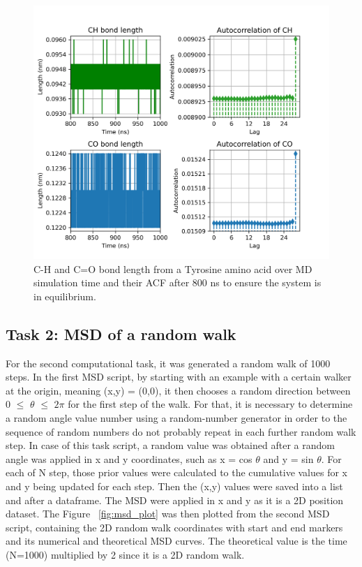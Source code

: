 \documentclass{article}
\begin{document}
\begin{figure}[H]
\includegraphics[width=\linewidth]{CO_CH_length_acf_plot.png}
\caption{C-H and C=O bond length from a Tyrosine amino acid over MD simulation time and their ACF after 800 ns to ensure the system is in equilibrium.}
\label{fig:acf_plot}
\end{figure}

\subsection{Task 2: MSD of a random walk}

For the second computational task, it was generated a random walk of 1000 steps. In the first MSD script, by starting with an example with a certain walker at the origin, meaning (x,y) = (0,0), it then chooses a random direction between 0 $\leq$ $\theta$ $\leq$ $2\pi$ for the first step of the walk. For that, it is necessary to determine a random angle value number using a random-number generator in order to the sequence of random numbers do not probably repeat in each further random walk step. In case of this task script, a random value was obtained after a random angle was applied in x and y coordinates, such as x = cos $\theta$ and y = sin $\theta$. For each of N step, those prior values were calculated to the cumulative values for x and y being updated for each step. Then the (x,y) values were saved into a list and after a dataframe. The MSD were applied in x and y as it is a 2D position dataset. The Figure ~\ref{fig:msd_plot} was then plotted from the second MSD script, containing the 2D random walk coordinates with start and end markers and its numerical and theoretical MSD curves. The theoretical value is the time (N=1000) multiplied by 2 since it is a 2D random walk.
\end{document}
